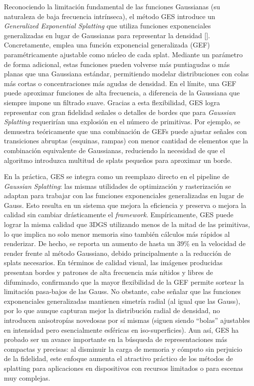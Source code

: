 Reconociendo la limitación fundamental de las funciones Gaussianas (su naturaleza de baja frecuencia intrínseca), el método GES introduce un \textit{Generalized Exponential Splatting} que utiliza funciones exponenciales generalizadas en lugar de Gaussianas para representar la densidad  [\cite{hamdi2024ges}]. Concretamente, emplea una función exponencial generalizada (GEF) paramétricamente ajustable como núcleo de cada splat. Mediante un parámetro de forma adicional, estas funciones pueden volverse más puntiagudas o más planas que una Gaussiana estándar, permitiendo modelar distribuciones con colas más cortas o concentraciones más agudas de densidad. En el límite, una GEF puede aproximar funciones de alta frecuencia, a diferencia de la Gaussiana que siempre impone un filtrado suave. Gracias a esta flexibilidad, GES logra representar con gran fidelidad señales o detalles de bordes que para \textit{Gaussian Splatting} requerirían una explosión en el número de primitivas. Por ejemplo, se demuestra teóricamente que una combinación de GEFs puede ajustar señales con transiciones abruptas (esquinas, rampas) con menor cantidad de elementos que la combinación equivalente de Gaussianas, reduciendo la necesidad de que el algoritmo introduzca multitud de splats pequeños para aproximar un borde.

En la práctica, GES se integra como un reemplazo directo en el pipeline de \textit{Gaussian Splatting}: las mismas utilidades de optimización y rasterización se adaptan para trabajar con las funciones exponenciales generalizadas en lugar de Gauss. Esto resulta en un sistema que mejora la eficiencia y preserva o mejora la calidad sin cambiar drásticamente el \textit{framework}. Empíricamente, GES puede lograr la misma calidad que 3DGS utilizando menos de la mitad de las primitivas, lo que implica no solo menor memoria sino también cálculos más rápidos al renderizar. De hecho, se reporta un aumento de hasta un 39\% en la velocidad de render frente al método Gaussiano, debido principalmente a la reducción de splats necesarios. En términos de calidad visual, las imágenes producidas presentan bordes y patrones de alta frecuencia más nítidos y libres de difuminado, confirmando que la mayor flexibilidad de la GEF permite sortear la limitación pasa-bajos de las Gauss. No obstante, cabe señalar que las funciones exponenciales generalizadas mantienen simetría radial (al igual que las Gauss), por lo que aunque capturan mejor la distribución radial de densidad, no introducen anisotropías novedosas por sí mismas (siguen siendo “bolas” ajustables en intensidad pero esencialmente esféricas en iso-superficies). Aun así, GES ha probado ser un avance importante en la búsqueda de representaciones más compactas y precisas: al disminuir la carga de memoria y cómputo sin perjuicio de la fidelidad, este enfoque aumenta el atractivo práctico de los métodos de splatting para aplicaciones en dispositivos con recursos limitados o para escenas muy complejas.

